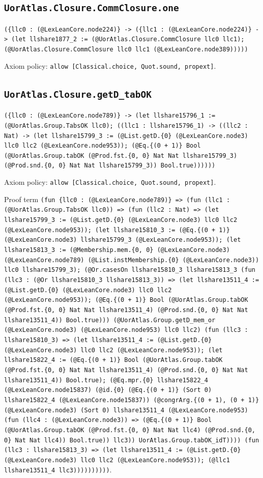 \documentclass[11pt]{article}
\begin{document}
\subsection*{\texttt{UorAtlas.Closure.CommClosure.one}}
\noindent\texttt{(\{llc0 : (@LexLeanCore.node224)\} -> (\{llc1 : (@LexLeanCore.node224)\} -> (let llshare1877\_2 := (@UorAtlas.Closure.CommClosure llc0 llc1); (@UorAtlas.Closure.CommClosure llc0 llc1 (@LexLeanCore.node389)))))}\par
\noindent Axiom policy: \texttt{allow [Classical.choice, Quot.sound, propext]}.\par
\subsection*{\texttt{UorAtlas.Closure.getD\_tabOK}}
\noindent\texttt{(\{llc0 : (@LexLeanCore.node789)\} -> (let llshare15796\_1 := (@UorAtlas.Group.TabsOK llc0); ((llc1 : llshare15796\_1) -> ((llc2 : Nat) -> (let llshare15799\_3 := (@List.getD.\{0\} (@LexLeanCore.node3) llc0 llc2 (@LexLeanCore.node953)); (@Eq.\{(0 + 1)\} Bool (@UorAtlas.Group.tabOK (@Prod.fst.\{0, 0\} Nat Nat llshare15799\_3) (@Prod.snd.\{0, 0\} Nat Nat llshare15799\_3)) Bool.true))))))}\par
\noindent Axiom policy: \texttt{allow [Classical.choice, Quot.sound, propext]}.\par
\noindent Proof term \texttt{(fun \{llc0 : (@LexLeanCore.node789)\} => (fun (llc1 : (@UorAtlas.Group.TabsOK llc0)) => (fun (llc2 : Nat) => (let llshare15799\_3 := (@List.getD.\{0\} (@LexLeanCore.node3) llc0 llc2 (@LexLeanCore.node953)); (let llshare15810\_3 := (@Eq.\{(0 + 1)\} (@LexLeanCore.node3) llshare15799\_3 (@LexLeanCore.node953)); (let llshare15813\_3 := (@Membership.mem.\{0, 0\} (@LexLeanCore.node3) (@LexLeanCore.node789) (@List.instMembership.\{0\} (@LexLeanCore.node3)) llc0 llshare15799\_3); (@Or.casesOn llshare15810\_3 llshare15813\_3 (fun (llc3 : (@Or llshare15810\_3 llshare15813\_3)) => (let llshare13511\_4 := (@List.getD.\{0\} (@LexLeanCore.node3) llc0 llc2 (@LexLeanCore.node953)); (@Eq.\{(0 + 1)\} Bool (@UorAtlas.Group.tabOK (@Prod.fst.\{0, 0\} Nat Nat llshare13511\_4) (@Prod.snd.\{0, 0\} Nat Nat llshare13511\_4)) Bool.true))) (@UorAtlas.Group.getD\_mem\_or (@LexLeanCore.node3) (@LexLeanCore.node953) llc0 llc2) (fun (llc3 : llshare15810\_3) => (let llshare13511\_4 := (@List.getD.\{0\} (@LexLeanCore.node3) llc0 llc2 (@LexLeanCore.node953)); (let llshare15822\_4 := (@Eq.\{(0 + 1)\} Bool (@UorAtlas.Group.tabOK (@Prod.fst.\{0, 0\} Nat Nat llshare13511\_4) (@Prod.snd.\{0, 0\} Nat Nat llshare13511\_4)) Bool.true); (@Eq.mpr.\{0\} llshare15822\_4 (@LexLeanCore.node15837) (@id.\{0\} (@Eq.\{(0 + 1)\} (Sort 0) llshare15822\_4 (@LexLeanCore.node15837)) (@congrArg.\{(0 + 1), (0 + 1)\} (@LexLeanCore.node3) (Sort 0) llshare13511\_4 (@LexLeanCore.node953) (fun (llc4 : (@LexLeanCore.node3)) => (@Eq.\{(0 + 1)\} Bool (@UorAtlas.Group.tabOK (@Prod.fst.\{0, 0\} Nat Nat llc4) (@Prod.snd.\{0, 0\} Nat Nat llc4)) Bool.true)) llc3)) UorAtlas.Group.tabOK\_idT)))) (fun (llc3 : llshare15813\_3) => (let llshare13511\_4 := (@List.getD.\{0\} (@LexLeanCore.node3) llc0 llc2 (@LexLeanCore.node953)); (@llc1 llshare13511\_4 llc3))))))))))}.\par
\end{document}
